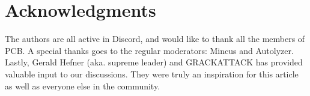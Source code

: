 \documentclass[12pt]{article}
\begin{document}
\section*{Acknowledgments}
The authors are all active in Discord, and would like to thank all the members of PCB. A special thanks goes to the regular moderators: Mincus and Autolyzer. Lastly, Gerald Hefner (aka. supreme leader) and GRACKATTACK has provided valuable input to our discussions. They were truly an inspiration for this article as well as everyone else in the community.









\clearpage
\end{document}
